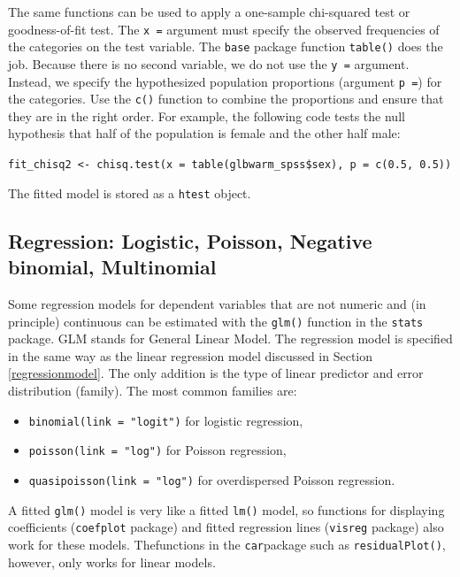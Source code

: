 \documentclass[doc,floatsintext]{apa6}
\providecommand{\tightlist}{%
  \setlength{\itemsep}{0pt}\setlength{\parskip}{0pt}}
\begin{document}
The same functions can be used to apply a one-sample chi-squared test or
goodness-of-fit test. The \texttt{x\ =} argument must specify the
observed frequencies of the categories on the test variable. The
\texttt{base} package function \texttt{table()} does the job. Because
there is no second variable, we do not use the \texttt{y\ =} argument.
Instead, we specify the hypothesized population proportions (argument
\texttt{p\ =}) for the categories. Use the \texttt{c()} function to
combine the proportions and ensure that they are in the right order. For
example, the following code tests the null hypothesis that half of the
population is female and the other half male:

\texttt{fit\_chisq2\ \textless{}-\ chisq.test(x\ =\ table(glbwarm\_spss\$sex),\ p\ =\ c(0.5,\ 0.5))}

The fitted model is stored as a \texttt{htest} object.

\subsection{Regression: Logistic, Poisson, Negative binomial,
Multinomial}\label{glm}

Some regression models for dependent variables that are not numeric and
(in principle) continuous can be estimated with the \texttt{glm()}
function in the \texttt{stats} package. GLM stands for General Linear
Model. The regression model is specified in the same way as the linear
regression model discussed in Section \ref{regressionmodel}. The only
addition is the type of linear predictor and error distribution
(family). The most common families are:

\begin{itemize}
\tightlist
\item
  \texttt{binomial(link\ =\ "logit")} for logistic regression,
\item
  \texttt{poisson(link\ =\ "log")} for Poisson regression,
\item
  \texttt{quasipoisson(link\ =\ "log")} for overdispersed Poisson
  regression.
\end{itemize}

A fitted \texttt{glm()} model is very like a fitted \texttt{lm()} model,
so functions for displaying coefficients (\texttt{coefplot} package) and
fitted regression lines (\texttt{visreg} package) also work for these
models. Thefunctions in the \texttt{car}package such as
\texttt{residualPlot()}, however, only works for linear models.
\end{document}
